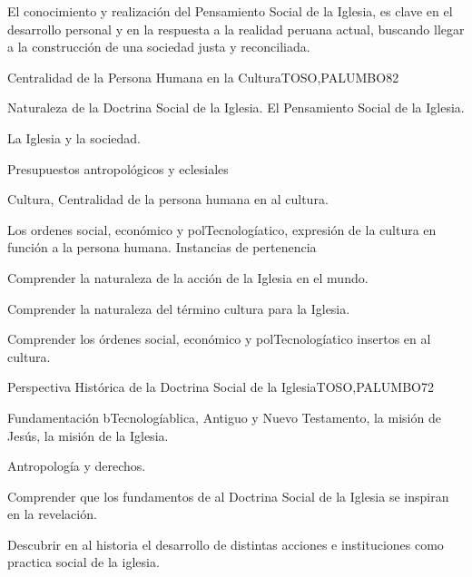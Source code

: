\begin{syllabus}


\begin{justification}
El conocimiento y realización del Pensamiento Social de la Iglesia, es clave en el desarrollo personal 
y en la respuesta a la realidad peruana actual, buscando llegar a la construcción de una 
sociedad justa y reconciliada.
\end{justification}

\begin{goals}
\item \OutcomeFH
\end{goals}

\begin{outcomes}
\end{outcomes}

\begin{unit}{Centralidad de la Persona Humana en la Cultura}{TOSO,PALUMBO}{8}{2}
\begin{topics}
	\item Naturaleza de la Doctrina Social de la Iglesia.  El Pensamiento Social de la Iglesia.
	\item La Iglesia y la sociedad.
	\item Presupuestos antropológicos y eclesiales
	\item Cultura, Centralidad de la persona humana en al cultura.
	\item Los ordenes social, económico y polTecnologíatico, expresión de la cultura en función a la persona humana.  Instancias de pertenencia
\end{topics}
\begin{learningoutcomes}
	\item Comprender la naturaleza de la acción de la Iglesia en el mundo.
	\item Comprender la naturaleza del término cultura para la Iglesia.
	\item Comprender los órdenes social, económico y polTecnologíatico insertos en al cultura.
\end{learningoutcomes}
\end{unit}

\begin{unit}{Perspectiva Histórica de la Doctrina Social de la Iglesia}{TOSO,PALUMBO}{7}{2}
\begin{topics}
	\item Fundamentación bTecnologíablica, Antiguo y Nuevo Testamento, la misión de Jesús, la misión de la Iglesia.
	\item Antropología y derechos.
\end{topics}
\begin{learningoutcomes}
	\item Comprender que los fundamentos de al Doctrina Social de la Iglesia se inspiran en la revelación.
	\item Descubrir en al historia el desarrollo de distintas acciones e instituciones como practica social de la iglesia.
\end{learningoutcomes}
\end{unit}


\end{syllabus}
